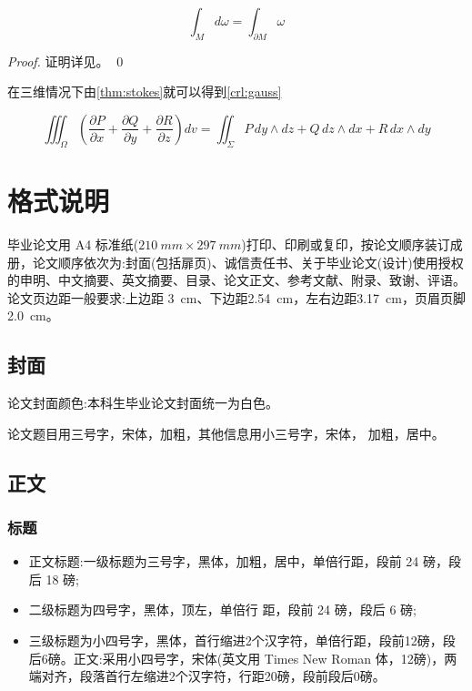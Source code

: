 \documentclass{LZU}
\begin{document}
\begin{theorem}[斯托克斯公式]
    \begin{equation}
        \int_M d\omega = \int_{\partial M} \omega
    \end{equation}
    \label{thm:stokes}
\end{theorem}
\begin{proof}
    证明详见\cite{stokes}。
    \qed
\end{proof}
在三维情况下由\cref{thm:stokes}就可以得到\cref{crl:gauss}
\begin{corollary}[高斯公式]
    \[\iiint_{\Omega}\left(\frac{\partial P}{\partial x}+\frac{\partial Q}{\partial y}+\frac{\partial R}{\partial z}\right)dv=\iint_{\Sigma}P\,dy\wedge dz+Q\,dz\wedge dx+R\,dx\wedge dy\]
    \label{crl:gauss}
\end{corollary}



\chapter{格式说明}
\label{chp:format}
毕业论文用 A4 标准纸($\SI{210}{mm}\times \SI{297}{mm}$)打印、印刷或复印，按论文顺序装订成册，论文顺序依次为:封面(包括扉页)、诚信责任书、关于毕业论文(设计)使用授权的申明、中文摘要、英文摘要、目录、论文正文、参考文献、附录、致谢、评语。论文页边距一般要求:上边距 \SI{3}{cm}、下边距\SI{2.54}{cm}，左右边距\SI{3.17}{cm}，页眉页脚\SI{2.0}{cm}。
\section{封面}
论文封面颜色:本科生毕业论文封面统一为白色。

论文题目用三号字，宋体，加粗，其他信息用小三号字，宋体， 加粗，居中。
\section{正文}
\subsection{标题}
\begin{itemize}
    \item 正文标题:一级标题为三号字，黑体，加粗，居中，单倍行距，段前 24 磅，段后 18 磅;
    \item 二级标题为四号字，黑体，顶左，单倍行 距，段前 24 磅，段后 6 磅;
    \item 三级标题为小四号字，黑体，首行缩进2个汉字符，单倍行距，段前12磅，段后6磅。正文:采用小四号字，宋体(英文用 Times New Roman 体，12磅)，两端对齐，段落首行左缩进2个汉字符，行距20磅，段前段后0磅。
\end{itemize}
\end{document}
